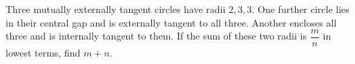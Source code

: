 Three mutually externally tangent circles have radii $2,3,3$. One further circle lies in their central gap and is externally tangent to all three. Another encloses all three and is internally tangent to them. If the sum of these two radii is $\dfrac{m}{n}$ in lowest terms, find $m+n$.
